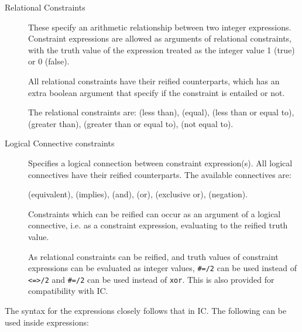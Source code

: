 \begin{description}
\item[Relational Constraints]
These specify an arithmetic relationship between two integer expressions.
Constraint expressions are allowed as arguments of relational constraints,
with the truth value of the expression treated as the integer value 1 (true)
or 0 (false).

All relational constraints have their reified counterparts, which has an extra
boolean argument that specify if the constraint is entailed or not.

The  relational constraints are:
 (less than),
 (equal), 
 (less than or equal to),
 (greater than),
 (greater than or equal to),
 (not equal to).

\item[Logical Connective constraints]
Specifies a logical connection between  constraint expression(s). 
All logical connectives have their reified counterparts.
The available connectives are:

 (equivalent),
 (implies),
 (and),
 (or),
 (exclusive or),
 (negation).

Constraints
which can be reified can occur as an argument of a logical connective, i.e.
as a constraint expression, evaluating to the reified truth value.

As relational constraints can be reified, and truth values of constraint
expressions can be evaluated as integer values, \texttt{\#=/2} can be used
instead of \texttt{<=>/2} and \texttt{\#\bsl=/2} can be used instead of
\texttt{xor}. This is also provided for compatibility with IC.


\end{description}

The syntax for the expressions closely follows that in IC. The 
following can be used inside expressions:


